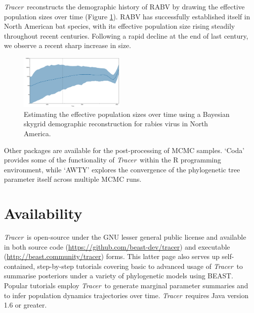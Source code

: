 \documentclass{bioinfo_tracer}
\newcommand{\tracer}{\emph{Tracer}}
\begin{document}
\tracer\ reconstructs the demographic history of RABV by drawing the effective population sizes over time (Figure \ref{fig:rabv}).
RABV has successfully established itself in North American bat species, with its effective population size rising steadily throughout recent centuries.
Following a rapid decline at the end of last century, we observe a recent sharp increase in size.

\begin{figure}[t]
\centerline{
\includegraphics[width=0.46\textwidth]{./figures/rabv-skygrid.pdf}
}
\vspace{-0.25cm}
\caption{Estimating the effective population sizes over time using a Bayesian skygrid demographic reconstruction for rabies virus in North America.}
\label{fig:rabv}
\end{figure}



Other packages are available for the post-processing of MCMC samples. %
 `Coda' \citep{plummer2006coda} provides some of the functionality of \tracer\ within the R programming environment, while `AWTY' \citep{nylander2007awty} explores the convergence of the phylogenetic tree parameter itself across multiple MCMC runs.

\vspace{-0.35cm}

\section*{Availability}

\tracer\ is open-source under the GNU lesser general public license and available in both source code (\url{https://github.com/beast-dev/tracer}) and executable (\url{http://beast.community/tracer}) forms.
This latter page also serves up self-contained, step-by-step tutorials covering basic to advanced usage of \tracer\ to summarise posteriors under a variety of phylogenetic models using BEAST.
Popular tutorials employ \tracer\ to generate marginal parameter summaries and to infer population dynamics trajectories over time.
\tracer\ requires Java version 1.6 or greater.
\end{document}
